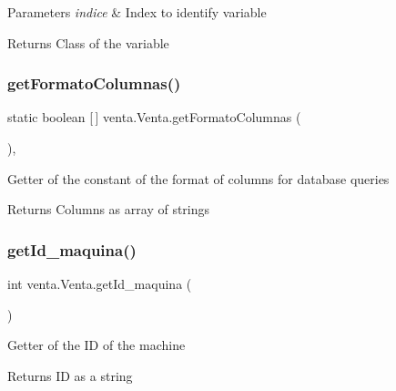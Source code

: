\begin{DoxyParams}{Parameters}
{\em indice} & Index to identify variable \\
\hline
\end{DoxyParams}
\begin{DoxyReturn}{Returns}
Class of the variable 
\end{DoxyReturn}
\mbox{\label{classventa_1_1_venta_a82a6dd2795bd37dc1a72ffb5cb36a156}} 
\subsubsection{\texorpdfstring{get\+Formato\+Columnas()}{getFormatoColumnas()}}
{\footnotesize\ttfamily static boolean \mbox{[}$\,$\mbox{]} venta.\+Venta.\+get\+Formato\+Columnas (\begin{DoxyParamCaption}{ }\end{DoxyParamCaption})\hspace{0.3cm}{\ttfamily [inline]}, {\ttfamily [static]}}

Getter of the constant of the format of columns for database queries

\begin{DoxyReturn}{Returns}
Columns as array of strings 
\end{DoxyReturn}
\mbox{\label{classventa_1_1_venta_a07718971227218ff55a5cf0c44c03059}} 
\subsubsection{\texorpdfstring{get\+Id\+\_\+maquina()}{getId\_maquina()}}
{\footnotesize\ttfamily int venta.\+Venta.\+get\+Id\+\_\+maquina (\begin{DoxyParamCaption}{ }\end{DoxyParamCaption})\hspace{0.3cm}{\ttfamily [inline]}}

Getter of the ID of the machine

\begin{DoxyReturn}{Returns}
ID as a string 
\end{DoxyReturn}
\mbox{\label{classventa_1_1_venta_a85785872bbb69c39c36493c9ac0ef944}} 
